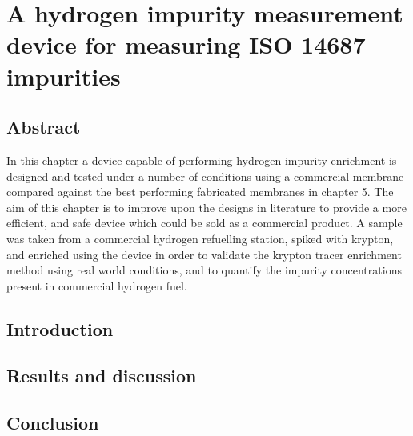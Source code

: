 \chapter{A hydrogen impurity measurement device for measuring ISO 14687 impurities}

\section{Abstract}
In this chapter a device capable of performing hydrogen impurity enrichment is designed and tested under a number of conditions using a commercial membrane compared against the best performing fabricated membranes in chapter 5. The aim of this chapter is to improve upon the designs in literature to provide a more efficient, and safe device which could be sold as a commercial product. A sample was taken from a commercial hydrogen refuelling station, spiked with krypton, and enriched using the device in order to validate the krypton tracer enrichment method using real world conditions, and to quantify the impurity concentrations present in commercial hydrogen fuel. 

\section{Introduction}


\section{Results and discussion}

\section{Conclusion}
% 
% 